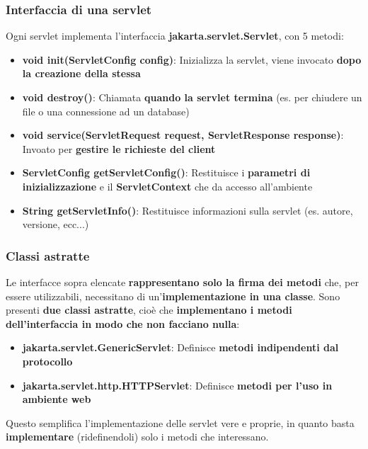 \documentclass[12pt]{article}
\begin{document}
\subsubsection{Interfaccia di una servlet}
Ogni servlet implementa l'interfaccia \textbf{jakarta.servlet.Servlet}, con 5 metodi:
\begin{itemize}
    \item \textbf{void init(ServletConfig config)}: Inizializza la servlet, viene invocato \textbf{dopo la creazione della stessa}
    \item \textbf{void destroy()}: Chiamata \textbf{quando la servlet termina} (es. per chiudere un file o una connessione ad un database)
    \item \textbf{void service(ServletRequest request, ServletResponse response)}: Invoato per \textbf{gestire le richieste del client}
    \item \textbf{ServletConfig getServletConfig()}: Restituisce i \textbf{parametri di inizializzazione} e il \textbf{ServletContext} che da accesso all'ambiente
    \item \textbf{String getServletInfo()}: Restituisce informazioni sulla servlet (es. autore, versione, ecc...)
\end{itemize}
\subsubsection{Classi astratte}
Le interfacce sopra elencate \textbf{rappresentano solo la firma dei metodi} che, per essere utilizzabili, necessitano di un'\textbf{implementazione in una classe}.
Sono presenti \textbf{due classi astratte}, cioè che \textbf{implementano i metodi dell'interfaccia in modo che non facciano nulla}:
\begin{itemize}
    \item \textbf{jakarta.servlet.GenericServlet}: Definisce \textbf{metodi indipendenti dal protocollo}
    \item \textbf{jakarta.servlet.http.HTTPServlet}: Definisce \textbf{metodi per l'uso in ambiente web}
\end{itemize}
Questo semplifica l'implementazione delle servlet vere e proprie, in quanto basta \textbf{implementare} (ridefinendoli) solo i metodi che interessano.
\end{document}
